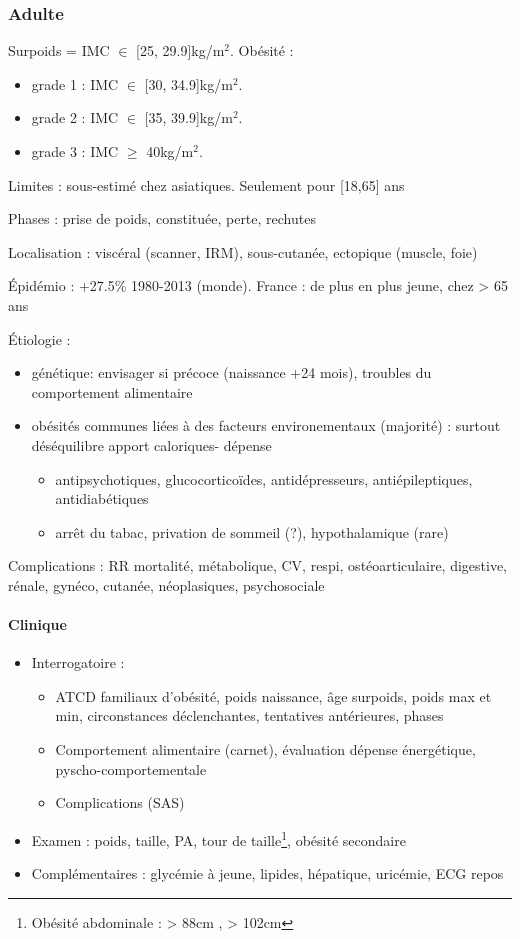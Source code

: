 \documentclass[11pt]{article}
\begin{document}
\subsubsection{Adulte}
\label{sec:org5a65061}
Surpoids = IMC \(\in\) [25, 29.9]kg/m\(^{\text{2}}\). Obésité :
\begin{itemize}
\item grade 1 : IMC \(\in\) [30, 34.9]kg/m\(^{\text{2}}\).
\item grade 2 : IMC \(\in\) [35, 39.9]kg/m\(^{\text{2}}\).
\item grade 3 : IMC \(\ge\) 40kg/m\(^{\text{2}}\).
\end{itemize}

Limites : sous-estimé chez asiatiques. Seulement pour [18,65] ans

Phases : prise de poids, constituée, perte, rechutes

Localisation : viscéral (scanner, IRM), sous-cutanée, ectopique (muscle, foie)

Épidémio : +27.5\% 1980-2013 (monde). France : de plus en plus jeune, \inc chez >
65 ans

Étiologie :
\begin{itemize}
\item génétique: envisager si précoce (naissance +24 mois), troubles du
comportement alimentaire
\item obésités communes liées à des facteurs environementaux (majorité) : surtout
déséquilibre apport caloriques- dépense
\begin{itemize}
\item antipsychotiques, glucocorticoïdes, antidépresseurs,
antiépileptiques, antidiabétiques
\item arrêt du tabac, privation de sommeil (?), hypothalamique (rare)
\end{itemize}
\end{itemize}

Complications : \inc RR mortalité, métabolique, CV, respi, ostéoarticulaire,
digestive, rénale, gynéco, cutanée, néoplasiques, psychosociale

\paragraph{Clinique}
\label{sec:orge00b587}
\begin{itemize}
\item Interrogatoire : 
\begin{itemize}
\item ATCD familiaux d'obésité, poids naissance, âge surpoids,
poids max et min, circonstances déclenchantes, tentatives antérieures, phases
\item Comportement alimentaire (carnet), évaluation dépense énergétique, pyscho-comportementale
\item Complications (SAS)
\end{itemize}
\item Examen : poids, taille, PA, tour de taille\footnote{Obésité abdominale : > 88cm \female, > 102cm \male}, obésité secondaire
\item Complémentaires : glycémie à jeune, lipides, hépatique, uricémie, ECG repos
\end{itemize}
\end{document}
